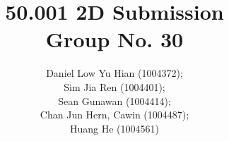 \documentclass[a4paper,12pt]{article}
\begin{document}
\title{\Large{\textbf{50.001 2D Submission \\ Group No. 30 }}}
\author{Daniel Low Yu Hian (1004372); \\ 
Sim Jia Ren (1004401); \\ 
Sean Gunawan (1004414); \\ 
Chan Jun Hern, Cawin (1004487); \\ 
Huang He (1004561)}

\maketitle
\end{document}
